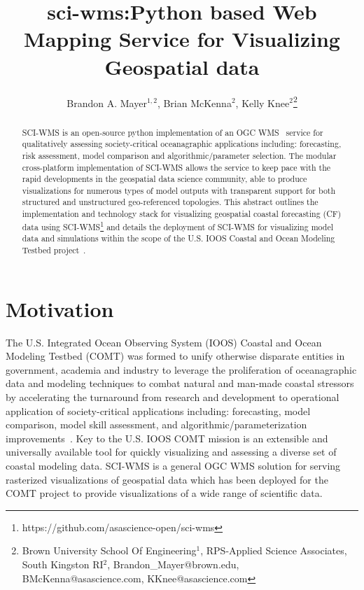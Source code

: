 \documentclass[11pt,twocolumn,twoside]{IEEEtran}
\newcommand{\comt}{COMT}
\newcommand{\ioos}{IOOS}
\newcommand{\ogc}{OGC}
\newcommand{\wms}{WMS}
\newcommand{\sciwms}{SCI-WMS}
\begin{document}
\title{\vspace{0.2in}\sc sci-wms:Python based Web Mapping Service for Visualizing Geospatial data}

\author{Brandon A. Mayer$^{1,2}$, Brian McKenna$^{2}$, Kelly Knee$^{2}$\thanks{Brown University School Of Engineering$^{1}$, RPS-Applied Science Associates, South Kingston RI$^{2}$, Brandon\_Mayer@brown.edu, BMcKenna@asascience.com, KKnee@asascience.com}}

\maketitle
\thispagestyle{fancy}

\begin{abstract}
\sciwms{} is an open-source python implementation of an \ogc{}
\wms{}~\cite{wms14} service for qualitatively assessing
society-critical oceanagraphic applications including: forecasting,
risk assessment, model comparison and algorithmic/parameter
selection. The modular cross-platform implementation of \sciwms{}
allows the service to keep pace with the rapid developments in the
geospatial data science community, able to produce visualizations for
numerous types of model outputs with transparent support for both
structured and unstructured geo-referenced topologies. This abstract
outlines the implementation and technology stack for visualizing
geospatial coastal forecasting (CF) data using
\sciwms{}\footnote{https://github.com/asascience-open/sci-wms} and
details the deployment of \sciwms{} for visualizing model data and
simulations within the scope of the U.S. \ioos{} Coastal and Ocean
Modeling Testbed project~\cite{luettich13}.
\end{abstract}

\section{Motivation}
The U.S. Integrated Ocean Observing System (\ioos{}) Coastal and Ocean
Modeling Testbed (\comt{}) was formed to unify otherwise disparate
entities in government, academia and industry to leverage the
proliferation of oceanagraphic data and modeling techniques to combat
natural and man-made coastal stressors by accelerating the turnaround
from research and development to operational application of
society-critical applications including: forecasting, model
comparison, model skill assessment, and algorithmic/parameterization
improvements~\cite{luettich13}. Key to the U.S. \ioos{} \comt{}
mission is an extensible and universally available tool for quickly
visualizing and assessing a diverse set of coastal modeling
data. \sciwms{} is a general \ogc{} \wms{} solution for serving
rasterized visualizations of geospatial data which has been deployed
for the \comt{} project to provide visualizations of a wide range of
scientific data.
\end{document}

